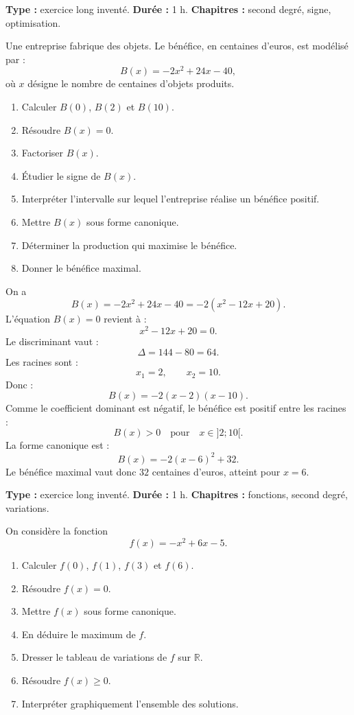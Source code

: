 \documentclass[11pt,a4paper]{article}
\newcommand{\R}{\mathbb{R}}
\begin{document}
\hypertarget{P-SUJET-02}{}
\begin{sujettype}
\textbf{Type :} exercice long inventé.  
\textbf{Durée :} 1 h.  
\textbf{Chapitres :} second degré, signe, optimisation.

Une entreprise fabrique des objets. Le bénéfice, en centaines d'euros, est modélisé par :
\[
B(x)=-2x^2+24x-40,
\]
où $x$ désigne le nombre de centaines d'objets produits.

\begin{enumerate}
  \item Calculer $B(0)$, $B(2)$ et $B(10)$.
  \item Résoudre $B(x)=0$.
  \item Factoriser $B(x)$.
  \item Étudier le signe de $B(x)$.
  \item Interpréter l'intervalle sur lequel l'entreprise réalise un bénéfice positif.
  \item Mettre $B(x)$ sous forme canonique.
  \item Déterminer la production qui maximise le bénéfice.
  \item Donner le bénéfice maximal.
\end{enumerate}
\end{sujettype}

\begin{corrige}[P-SUJET-02]
On a
\[
B(x)=-2x^2+24x-40=-2(x^2-12x+20).
\]
L'équation $B(x)=0$ revient à :
\[
x^2-12x+20=0.
\]
Le discriminant vaut :
\[
\Delta=144-80=64.
\]
Les racines sont :
\[
x_1=2,\qquad x_2=10.
\]
Donc :
\[
B(x)=-2(x-2)(x-10).
\]
Comme le coefficient dominant est négatif, le bénéfice est positif entre les racines :
\[
B(x)>0\quad\text{pour}\quad x\in]2;10[.
\]
La forme canonique est :
\[
B(x)=-2(x-6)^2+32.
\]
Le bénéfice maximal vaut donc $32$ centaines d'euros, atteint pour $x=6$.
\end{corrige}

\hypertarget{P-SUJET-03}{}
\begin{sujettype}
\textbf{Type :} exercice long inventé.  
\textbf{Durée :} 1 h.  
\textbf{Chapitres :} fonctions, second degré, variations.

On considère la fonction
\[
f(x)=-x^2+6x-5.
\]

\begin{enumerate}
  \item Calculer $f(0)$, $f(1)$, $f(3)$ et $f(6)$.
  \item Résoudre $f(x)=0$.
  \item Mettre $f(x)$ sous forme canonique.
  \item En déduire le maximum de $f$.
  \item Dresser le tableau de variations de $f$ sur $\R$.
  \item Résoudre $f(x)\geq0$.
  \item Interpréter graphiquement l'ensemble des solutions.
\end{enumerate}
\end{sujettype}
\end{document}
